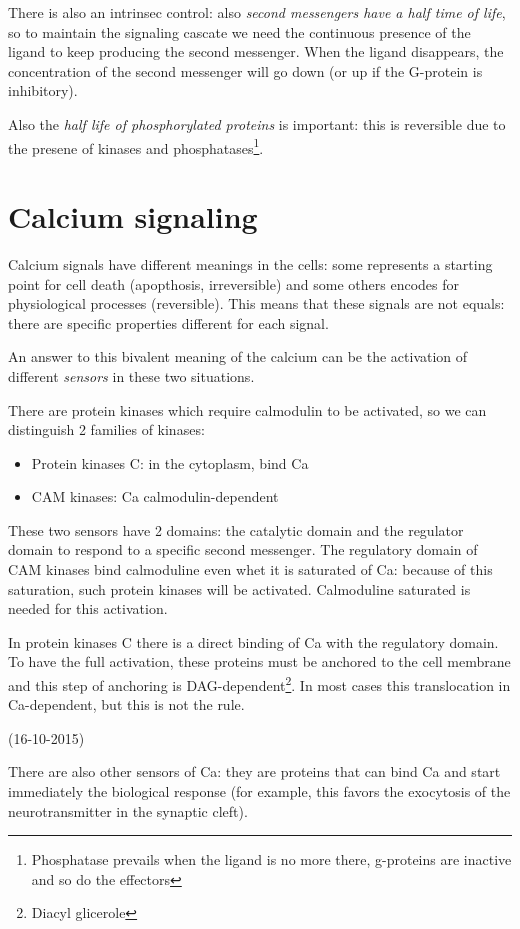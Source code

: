 \documentclass[a4paper, 12pt]{book}
\begin{document}
There is also an intrinsec control: also \emph{second messengers have a half time of life}, so to maintain the signaling cascate we need the continuous presence of the ligand to keep producing the second messenger. When the ligand disappears, the concentration of the second messenger will go down (or up if the G-protein is inhibitory).

Also the \emph{half life of phosphorylated proteins} is important: this is reversible due to the presene of kinases and phosphatases\footnote{Phosphatase prevails when the ligand is no more there, g-proteins are inactive and so do the effectors}. 

\chapter{Calcium signaling}
Calcium signals have different meanings in the cells: some represents a starting point for cell death (apopthosis, irreversible) and some others encodes for physiological processes (reversible). This means that these signals are not equals: there are specific properties different for each signal.

An answer to this bivalent meaning of the calcium can be the activation of different \emph{sensors} in these two situations. 

There are protein kinases which require calmodulin to be activated, so we can distinguish 2 families of kinases:
\begin{itemize}
\item{Protein kinases C: in the cytoplasm, bind Ca}
\item{CAM kinases: Ca calmodulin-dependent}
\end{itemize}

These two sensors have 2 domains: the catalytic domain and the regulator domain to respond to a specific second messenger. The regulatory domain of CAM kinases bind calmoduline even whet it is saturated of Ca: because of this saturation, such protein kinases will be activated. Calmoduline saturated is needed for this activation.

In protein kinases C there is a direct binding of Ca with the regulatory domain. To have the full activation, these proteins must be anchored to the cell membrane and this step of anchoring is DAG-dependent\footnote{Diacyl glicerole}. In most cases this translocation in Ca-dependent, but this is not the rule.

(16-10-2015)

There are also other sensors of Ca: they are proteins that can bind Ca and start immediately the biological response (for example, this favors the exocytosis of the neurotransmitter in the synaptic cleft). 
\end{document}
